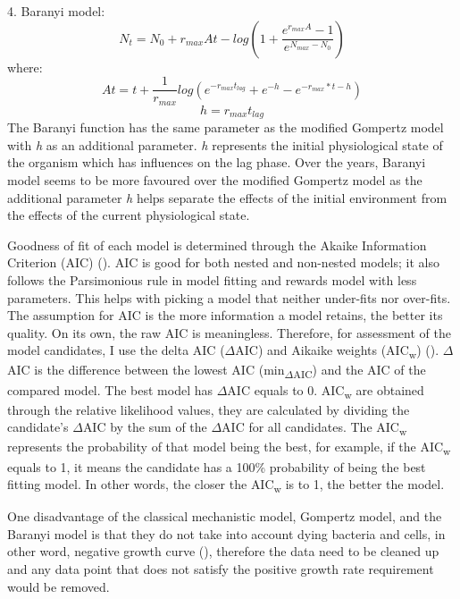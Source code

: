 \documentclass[11pt]{article}
\begin{document}
4. Baranyi model:
\begin{equation}
    N_{t} = N_{0} + r_{max}At - log(1 + \frac{{e ^ {r_{max}A} - 1}}{e^{N_{max} - N_{0}}})
\end{equation}
where:
\begin{equation}
    At = t + \frac{1}{r_{max}}log({e ^ {-r_{max}t_{lag}} + e ^ {-h} - e ^ {-r_{max} * t - h}})
\end{equation}
\begin{equation}
    h = r_{max} t_{lag}
\end{equation}
The Baranyi function has the same parameter as the modified Gompertz model with \emph{h} as an additional parameter. \emph{h} represents the initial physiological state of the organism which has influences on the lag phase. Over the years, Baranyi model seems to be more favoured over the modified Gompertz model as the additional parameter \emph{h} helps separate the effects of the initial environment from the effects of the current physiological state. 

Goodness of fit of each model is determined through the Akaike Information Criterion (AIC) (\cite{1100705}). AIC is good for both nested and non-nested models; it also follows the Parsimonious rule in model fitting and rewards model with less parameters. This helps with picking a model that neither under-fits nor over-fits. The assumption for AIC is the more information a model retains, the better its quality. On its own, the raw AIC is meaningless. Therefore, for assessment of the model candidates, I use the delta AIC ($\Delta$AIC) and Aikaike weights ({AIC\textsubscript{w}}) ({\cite{doi:https://doi.org/10.1002/9781118856406.app5}}). $\Delta$AIC is the difference between the lowest AIC ({min\textsubscript{$\Delta$AIC}}) and the AIC of the compared model. The best model has $\Delta$AIC equals to 0. {AIC\textsubscript{w}} are obtained through the relative likelihood values, they are calculated by dividing the candidate's $\Delta$AIC by the sum of the $\Delta$AIC for all candidates. The {AIC\textsubscript{w}} represents the probability of that model being the best, for example, if the {AIC\textsubscript{w}} equals to 1, it means the candidate has a 100\% probability of being the best fitting model. In other words, the closer the {AIC\textsubscript{w}} is to 1, the better the model. 

One disadvantage of the classical mechanistic model, Gompertz model, and the Baranyi model is that they do not take into account dying bacteria and cells, in other word, negative growth curve ({\cite{doi:10.1080/10408398.2011.570463}}), therefore the data need to be cleaned up and any data point that does not satisfy the positive growth rate requirement would be removed. 
\end{document}
